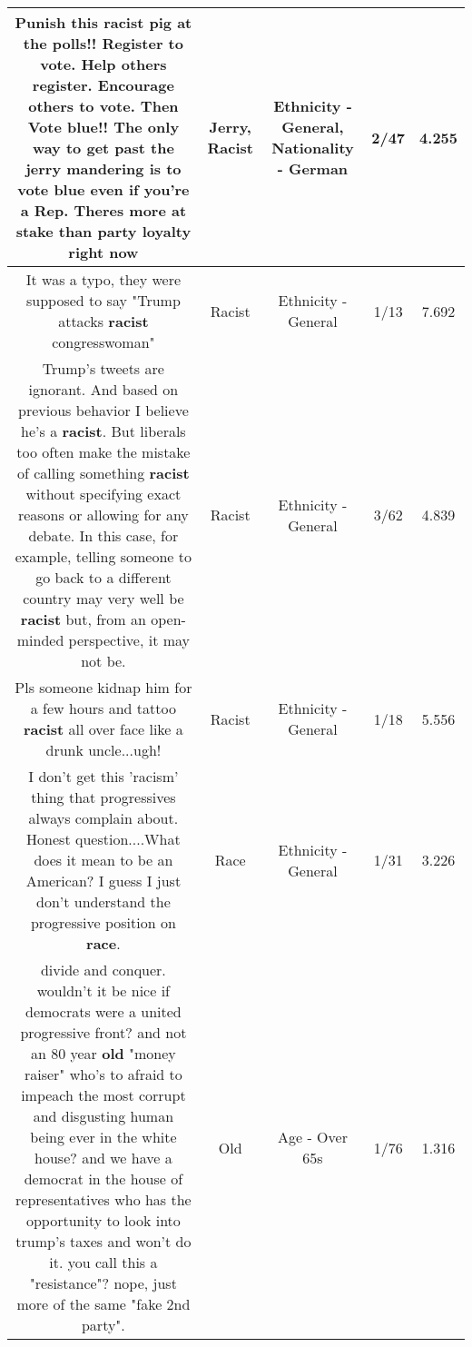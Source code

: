\documentclass[11pt]{article}
\newlength\mylength
\begin{document}
\begin{center}
\begin{longtable}{|C{.65\mylength}|C{.30\mylength}|C{.12\mylength}|C{.12\mylength}|C{.12\mylength}|}
  \small Punish this \textbf{racist} pig at the polls!! Register to vote. Help others register. Encourage others to vote. Then Vote blue!! The only way to get past the \textbf{jerry} mandering is to vote blue even if you're a Rep. Theres more at stake than party loyalty  right now\normalsize   & Jerry, Racist & Ethnicity - General, Nationality - German & 2/47 & 4.255 \\  \hline
  \small It was a typo, they were supposed to say "Trump attacks \textbf{racist} congresswoman"\normalsize   & Racist & Ethnicity - General & 1/13 & 7.692 \\  \hline
  \small Trump's tweets are ignorant. And based on previous behavior I believe he's a \textbf{racist}. But liberals too often make the mistake of calling something \textbf{racist} without specifying exact reasons or allowing for any debate. In this case, for example, telling someone to go back to a different country may very well be \textbf{racist} but, from an open-minded perspective, it may not be.\normalsize   & Racist & Ethnicity - General & 3/62 & 4.839 \\  \hline
  \small Pls someone kidnap him for a few hours and tattoo \textbf{racist} all over face like a drunk uncle...ugh!\normalsize   & Racist & Ethnicity - General & 1/18 & 5.556 \\  \hline
  \small I don't get this 'racism' thing that progressives always complain about.  Honest question....What does it mean to be an American?  I guess I just don't understand the progressive position on \textbf{race}.\normalsize   & Race & Ethnicity - General & 1/31 & 3.226 \\  \hline
  \small divide and conquer.   wouldn't it be nice if democrats were a united progressive front?   and not an 80 year \textbf{old} "money raiser" who's to afraid to impeach the most corrupt and disgusting human being ever in the white house?   and we have a democrat in the house of representatives who has the opportunity to look into trump's taxes and won't do it.   you call this a "resistance"?   nope, just more of the same "fake 2nd party".\normalsize   & Old & Age - Over 65s & 1/76 & 1.316 \\  \hline

\end{longtable}
\end{center}
\end{document}
